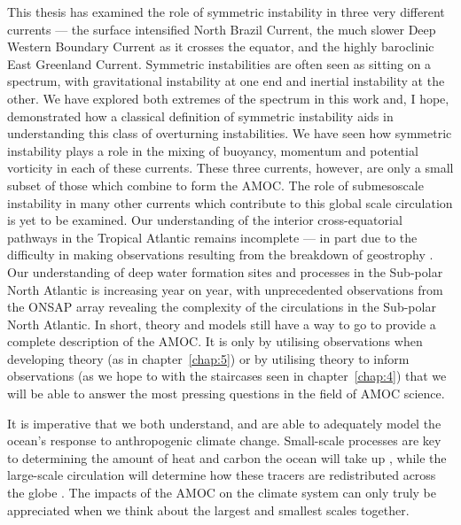 This thesis has examined the role of symmetric instability in three very different currents --- the surface intensified North Brazil Current, the much slower Deep Western Boundary Current as it crosses the equator, and the highly baroclinic East Greenland Current. Symmetric instabilities are often seen as sitting on a spectrum, with gravitational instability at one end and inertial instability at the other. We have explored both extremes of the spectrum in this work and, I hope, demonstrated how a classical definition of symmetric instability aids in understanding this class of overturning instabilities. We have seen how symmetric instability plays a role in the mixing of buoyancy, momentum and potential vorticity in each of these currents. These three currents, however, are only a small subset of those which combine to form the AMOC. The role of submesoscale instability in many other currents which contribute to this global scale circulation is yet to be examined. Our understanding of the interior cross-equatorial pathways in the Tropical Atlantic remains incomplete --- in part due to the difficulty in making observations resulting from the breakdown of geostrophy \citep[see e.g.][]{Vianna2003}. Our understanding of deep water formation sites and processes in the Sub-polar North Atlantic is increasing year on year, with unprecedented observations from the ONSAP array revealing the complexity of the circulations in the Sub-polar North Atlantic. In short, theory and models still have a way to go to provide a complete description of the AMOC. It is only by utilising observations when developing theory (as in chapter~\ref{chap:5}) or by utilising theory to inform observations (as we hope to with the staircases seen in chapter~\ref{chap:4}) that we will be able to answer the most pressing questions in the field of AMOC science.

It is imperative that we both understand, and are able to adequately model the ocean's response to anthropogenic climate change. Small-scale processes are key to determining the amount of heat and carbon the ocean will take up \citep{DeLavergne2022}, while the large-scale circulation will determine how these tracers are redistributed across the globe \citep{Buckley2015}. The impacts of the AMOC on the climate system can only truly be appreciated when we think about the largest and smallest scales together.
